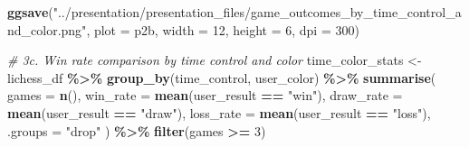\documentclass[
]{article}
\newenvironment{Shaded}{\begin{snugshade}}{\end{snugshade}}
\newcommand{\AttributeTok}[1]{\textcolor[rgb]{0.13,0.29,0.53}{#1}}
\newcommand{\CommentTok}[1]{\textcolor[rgb]{0.56,0.35,0.01}{\textit{#1}}}
\newcommand{\DecValTok}[1]{\textcolor[rgb]{0.00,0.00,0.81}{#1}}
\newcommand{\FunctionTok}[1]{\textcolor[rgb]{0.13,0.29,0.53}{\textbf{#1}}}
\newcommand{\NormalTok}[1]{#1}
\newcommand{\OtherTok}[1]{\textcolor[rgb]{0.56,0.35,0.01}{#1}}
\newcommand{\SpecialCharTok}[1]{\textcolor[rgb]{0.81,0.36,0.00}{\textbf{#1}}}
\newcommand{\StringTok}[1]{\textcolor[rgb]{0.31,0.60,0.02}{#1}}
\begin{document}
\begin{Shaded}
\begin{Highlighting}[]
\FunctionTok{ggsave}\NormalTok{(}\StringTok{"../presentation/presentation\_files/game\_outcomes\_by\_time\_control\_and\_color.png"}\NormalTok{, }\AttributeTok{plot =}\NormalTok{ p2b, }\AttributeTok{width =} \DecValTok{12}\NormalTok{, }\AttributeTok{height =} \DecValTok{6}\NormalTok{, }\AttributeTok{dpi =} \DecValTok{300}\NormalTok{)}

\CommentTok{\# 3c. Win rate comparison by time control and color}
\NormalTok{time\_color\_stats }\OtherTok{\textless{}{-}}\NormalTok{ lichess\_df }\SpecialCharTok{\%\textgreater{}\%}
  \FunctionTok{group\_by}\NormalTok{(time\_control, user\_color) }\SpecialCharTok{\%\textgreater{}\%}
  \FunctionTok{summarise}\NormalTok{(}
    \AttributeTok{games =} \FunctionTok{n}\NormalTok{(),}
    \AttributeTok{win\_rate =} \FunctionTok{mean}\NormalTok{(user\_result }\SpecialCharTok{==} \StringTok{"win"}\NormalTok{),}
    \AttributeTok{draw\_rate =} \FunctionTok{mean}\NormalTok{(user\_result }\SpecialCharTok{==} \StringTok{"draw"}\NormalTok{),}
    \AttributeTok{loss\_rate =} \FunctionTok{mean}\NormalTok{(user\_result }\SpecialCharTok{==} \StringTok{"loss"}\NormalTok{),}
    \AttributeTok{.groups =} \StringTok{"drop"}
\NormalTok{  ) }\SpecialCharTok{\%\textgreater{}\%}
  \FunctionTok{filter}\NormalTok{(games }\SpecialCharTok{\textgreater{}=} \DecValTok{3}\NormalTok{)}


\end{Highlighting}
\end{Shaded}
\end{document}
